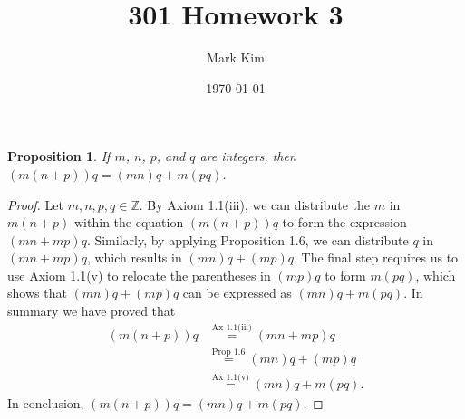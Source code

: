 \documentclass[12pt]{amsart}
\title{301 Homework 3}
\author{Mark Kim}
\date{\today}
\newcommand{\Z}{\mathbb{Z}}
\newtheorem*{proposition}{Proposition}
\begin{document}
\maketitle

\begin{proposition}
If $m$, $n$, $p$, and $q$ are integers, then $(m(n+p))q = (mn)q + m(pq)$.
\end{proposition}

\begin{proof}
Let $m,n,p,q\in\Z$. By Axiom 1.1(iii), we can distribute the $m$ in $m(n+p)$ within the equation $(m(n+p))q$ to form the expression $(mn+mp)q$. 
Similarly, by applying Proposition 1.6, we can distribute $q$ in $(mn+mp)q$, which results in $(mn)q+(mp)q$.  The final step requires us to use Axiom 1.1(v) to relocate the parentheses in $(mp)q$ to form $m(pq)$, which shows that $(mn)q+(mp)q$ can be expressed as $(mn)q + m(pq)$.  In summary we have proved that
\begin{align*}
(m(n+p))q&\stackrel{\text{Ax 1.1(iii)}}{=}(mn+mp)q\\
&\stackrel{\text{Prop 1.6}}{=}(mn)q+(mp)q\\
&\stackrel{\text{Ax 1.1(v)}}{=}(mn)q+m(pq).
\end{align*}
In conclusion, $(m(n+p))q = (mn)q + m(pq)$.
\end{proof}
\end{document}
